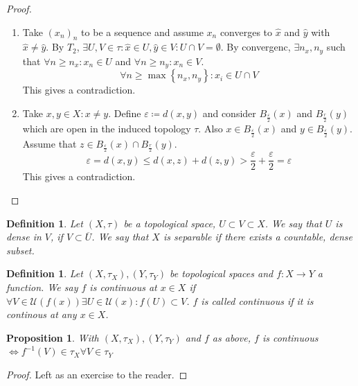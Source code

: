 \documentclass[a4paper]{article}
\newcounter{lecref}[section]
\numberwithin{lecref}{section}
\newtheorem{definition}[lecref]{Definition}
\newtheorem{proposition}[lecref]{Proposition}
\newcommand{\Set}[1]{\left\{#1\right\}}
\begin{document}
\begin{proof}
	\begin{enumerate}
		\item
			Take $(x_n)_n$ to be a sequence and assume $x_n$ converges to $\hat x$ and $\hat y$ with $\hat x \neq \hat y$. By $T_2$, $\exists U, V \in \tau: \hat x \in U, \hat y \in V: U \cap V = \emptyset$.
			By convergenc, $\exists n_x, n_y$ such that $\forall n \geq n_x: x_n \in U$ and $\forall n \geq n_y: x_n \in V$.
			\[ \forall n \geq \max\Set{n_x, n_y}: x_i \in U \cap V \]
			This gives a contradiction.
		\item
			Take $x, y \in X: x \neq y$. Define $\varepsilon \coloneqq d(x, y)$ and consider $B_{\frac{\varepsilon}{2}}(x)$ and $B_{\frac r2}(y)$ which are open in the induced topology $\tau$. Also $x \in B_{\frac\varepsilon2}(x)$ and $y \in B_{\frac\varepsilon2}(y)$. Assume that $z \in B_{\frac\varepsilon2}(x) \cap B_{\frac r2}(y)$.
			\[ \varepsilon = d(x, y) \leq d(x, z) + d(z, y) > \frac\varepsilon2 + \frac\varepsilon2 = \varepsilon \]
			This gives a contradiction.
	\end{enumerate}
\end{proof}

\begin{definition}
	\label{definition:1.9}
	Let $(X, \tau)$ be a topological space, $U \subset V \subset X$.
	We say that $U$ is \emph{dense} in $V$, if $V \subset \overline U$.
	We say that $X$ is \emph{separable} if there exists a countable, dense subset.
\end{definition}

\begin{definition}
	\label{definition:1.10}
	Let $(X, \tau_X), (Y, \tau_Y)$ be topological spaces and $f: X \to Y$ a function. We say $f$ is \emph{continuous} at $x \in X$ if $\forall V \in \mathcal U(f(x)) \exists U \in \mathcal U(x): f(U) \subset V$.
	$f$ is called \emph{continuous} if it is continous at any $x \in X$.
\end{definition}

\begin{proposition}
	\label{proposition:1.11}
	With $(X, \tau_X), (Y, \tau_Y)$ and $f$ as above,
	$f$ is continuous $\iff f^{-1}(V) \in \tau_X \forall V \in \tau_Y$
\end{proposition}
\begin{proof}
	Left as an exercise to the reader.
\end{proof}
\end{document}
